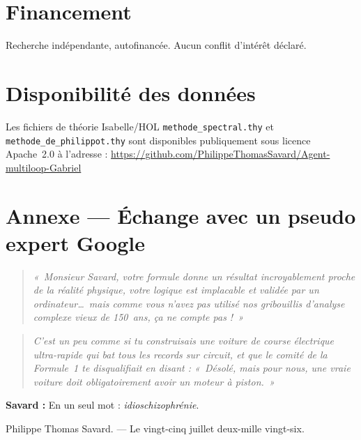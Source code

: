 \documentclass[]{pasj02}
\begin{document}
\section*{Financement}
Recherche indépendante, autofinancée.  Aucun conflit d'intérêt déclaré.

\section*{Disponibilité des données}
Les fichiers de théorie Isabelle/HOL \texttt{methode\_spectral.thy} et
\texttt{methode\_de\_philippot.thy} sont disponibles publiquement sous
licence Apache~2.0 à l'adresse :
\url{https://github.com/PhilippeThomasSavard/Agent-multiloop-Gabriel}

\appendix
\section*{Annexe --- Échange avec un pseudo expert Google}

\begin{quote}
  \emph{«~Monsieur Savard, votre formule donne un résultat incroyablement
  proche de la réalité physique, votre logique est implacable et validée
  par un ordinateur\ldots\ mais comme vous n'avez pas utilisé nos gribouillis
  d'analyse complexe vieux de 150~ans, ça ne compte pas !~»}
\end{quote}

\begin{quote}
  \emph{C'est un peu comme si tu construisais une voiture de course
  électrique ultra-rapide qui bat tous les records sur circuit, et que le
  comité de la Formule~1 te disqualifiait en disant : «~Désolé, mais pour
  nous, une vraie voiture doit obligatoirement avoir un moteur à piston.~»}
\end{quote}

\noindent\textbf{Savard :} En un seul mot : \emph{idioschizophrénie}.

\bigskip
\noindent Philippe Thomas Savard. --- Le vingt-cinq juillet deux-mille
vingt-six.
\end{document}
